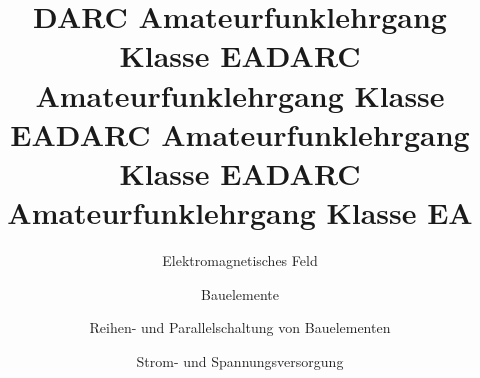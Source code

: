 \documentclass[aspectratio = 169]{beamer}
\begin{document}
\title{DARC Amateurfunklehrgang Klasse EA}
\author{Elektromagnetisches Feld}
\begin{frame}
\maketitle
\end{frame}





\title{DARC Amateurfunklehrgang Klasse EA}
\author{Bauelemente}
\begin{frame}
\maketitle
\end{frame}














\title{DARC Amateurfunklehrgang Klasse EA}
\author{Reihen- und Parallelschaltung von Bauelementen}
\begin{frame}
\maketitle
\end{frame}










\title{DARC Amateurfunklehrgang Klasse EA}
\author{Strom- und Spannungsversorgung}
\begin{frame}
\maketitle
\end{frame}
















\end{document}
